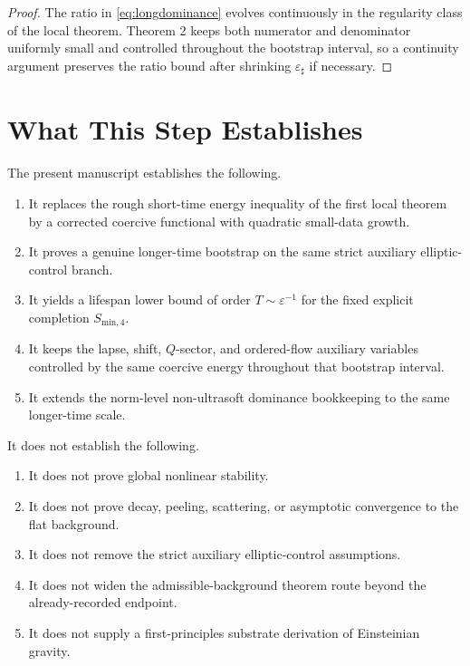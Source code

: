 \documentclass[11pt]{article}
\begin{document}
\begin{proof}
The ratio in \eqref{eq:longdominance} evolves continuously in the regularity class of the local theorem. Theorem 2 keeps both numerator and denominator uniformly small and controlled throughout the bootstrap interval, so a continuity argument preserves the ratio bound after shrinking \(\varepsilon_\sharp\) if necessary.
\end{proof}

\section{What This Step Establishes}

The present manuscript establishes the following.
\begin{enumerate}
    \item It replaces the rough short-time energy inequality of the first local theorem by a corrected coercive functional with quadratic small-data growth.
    \item It proves a genuine longer-time bootstrap on the same strict auxiliary elliptic-control branch.
    \item It yields a lifespan lower bound of order \(T\sim \varepsilon^{-1}\) for the fixed explicit completion \(S_{\mathrm{min},4}\).
    \item It keeps the lapse, shift, \(Q\)-sector, and ordered-flow auxiliary variables controlled by the same coercive energy throughout that bootstrap interval.
    \item It extends the norm-level non-ultrasoft dominance bookkeeping to the same longer-time scale.
\end{enumerate}

It does not establish the following.
\begin{enumerate}
    \item It does not prove global nonlinear stability.
    \item It does not prove decay, peeling, scattering, or asymptotic convergence to the flat background.
    \item It does not remove the strict auxiliary elliptic-control assumptions.
    \item It does not widen the admissible-background theorem route beyond the already-recorded endpoint.
    \item It does not supply a first-principles substrate derivation of Einsteinian gravity.
\end{enumerate}
\end{document}
